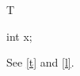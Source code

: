 \documentclass{article}
\begin{document}
\begin{table}[h]T\caption{T.}\label{t}\end{table}
\begin{listing}[h]int x;\caption{Code.}\label{l}\end{listing}
See \ref{t} and \ref{l}.
\end{document}
